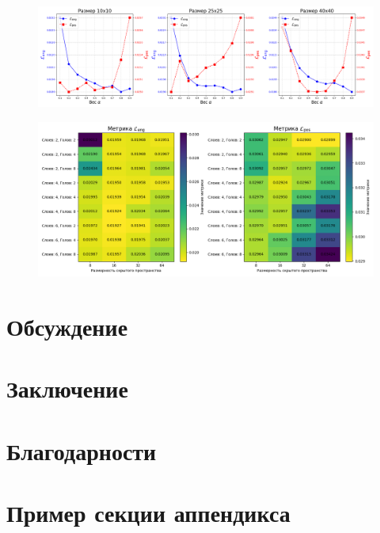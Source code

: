 \documentclass[a4paper,12pt]{extarticle}
\begin{document}
\begin{figure}[ht]
    \centering
    \includegraphics[width=1.0\textwidth]{graphics/exp3_alpha.png}
    \caption{}
    \label{graph:alpha}
\end{figure}

\begin{figure}[ht]
    \centering
    \includegraphics[width=1.0\textwidth]{graphics/exp4_model_params.png}
    \caption{}
    \label{graph:model_params}
\end{figure}

\section{Обсуждение}

\section{Заключение}

\section{Благодарности}

\newpage 
\printbibliography[heading=bibintoc] 


\newpage
\appendix

\section{Пример секции аппендикса}
\end{document}
